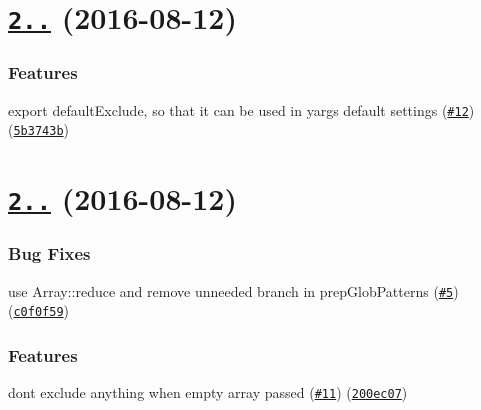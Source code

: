 \label{_2.1.0}%
 \section*{\href{https://github.com/istanbuljs/test-exclude/compare/v2.0.0...v2.1.0}{\tt 2..} (2016-\/08-\/12)}

\subsubsection*{Features}


\begin{DoxyItemize}
\item export default\+Exclude, so that it can be used in yargs\textquotesingle{} default settings (\href{https://github.com/istanbuljs/test-exclude/issues/12}{\tt \#12}) (\href{https://github.com/istanbuljs/test-exclude/commit/5b3743b}{\tt 5b3743b})
\end{DoxyItemize}

\label{_2.0.0}%
 \section*{\href{https://github.com/istanbuljs/test-exclude/compare/v1.1.0...v2.0.0}{\tt 2..} (2016-\/08-\/12)}

\subsubsection*{Bug Fixes}


\begin{DoxyItemize}
\item use Array\+::reduce and remove unneeded branch in prep\+Glob\+Patterns (\href{https://github.com/istanbuljs/test-exclude/issues/5}{\tt \#5}) (\href{https://github.com/istanbuljs/test-exclude/commit/c0f0f59}{\tt c0f0f59})
\end{DoxyItemize}

\subsubsection*{Features}


\begin{DoxyItemize}
\item don\textquotesingle{}t exclude anything when empty array passed (\href{https://github.com/istanbuljs/test-exclude/issues/11}{\tt \#11}) (\href{https://github.com/istanbuljs/test-exclude/commit/200ec07}{\tt 200ec07})
\end{DoxyItemize}


